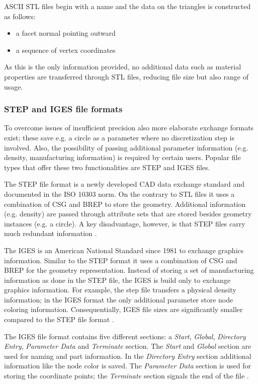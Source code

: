 ASCII \ac{STL} files begin with a name and the data on the triangles is constructed as follows: 
\begin{itemize}
\item a facet normal pointing outward
\item a sequence of vertex coordinates
\end{itemize}
As this is the only information provided, no additional data such as material properties are transferred through \ac{STL} files, reducing file size but also range of usage.
\subsubsection{\acs{STEP} and \acs{IGES} file formats}
To overcome issues of insufficient precision also more elaborate exchange formats exist; these save e.g. a circle as a parameter where no discretization step is involved. Also, the possibility of passing additional parameter information (e.g. density, manufacturing information) is required by certain users. Popular file types that offer these two functionalities are \acf{STEP} and \acf{IGES} files. 

The \ac{STEP} file format is a newly developed \ac{CAD} data exchange standard and documented in the ISO 10303 norm. On the contrary to \ac{STL} files it uses a combination of \ac{CSG} and \ac{BREP} to store the geometry. Additional information (e.g. density) are passed through attribute sets that are stored besides geometry instances (e.g. a circle). A key disadvantage, however, is that \ac{STEP} files carry much redundant information \cite{STL}.


The \acl{IGES} is an American National Standard since 1981 to exchange graphics information. Similar to the \ac{STEP} format it uses a combination of \ac{CSG} and \ac{BREP} for the geometry representation. Instead of storing a set of manufacturing information as done in the \ac{STEP} file, the \ac{IGES} is build only to exchange graphics information. For example, the step file transfers a physical density information; in the \ac{IGES} format the only additional parameter store node coloring information. Consequentially, \ac{IGES} file sizes are significantly smaller compared to the \ac{STEP} file format \cite{STL}.

The \ac{IGES} file format contains five different sections: a \emph{Start}, \emph{Global}, \emph{Directory Entry}, \emph{Parameter Data} and \emph{Terminate} section. The \emph{Start} and \emph{Global} section are used for naming and part information. In the \emph{Directory Entry} section additional information like the node color is saved. The \emph{Parameter Data} section is used for storing the coordinate points; the \emph{Terminate} section signals the end of the file \cite{sarcarCAD}.
